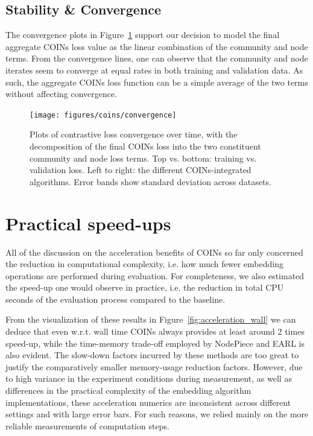 \subsection{Stability \& Convergence}

The convergence plots in Figure~\ref{fig:convergence} support our decision to model the final aggregate COINs loss value as the linear combination of the community and node terms. From the convergence lines, one can observe that the community and node iterates seem to converge at equal rates in both training and validation data. As such, the aggregate COINs loss function can be a simple average of the two terms without affecting convergence.

\begin{figure}[!ht]
\begin{center}
\texttt{[image: figures/coins/convergence]}
\end{center}
\caption[Plots of contrastive loss convergence over time.]{Plots of contrastive loss convergence over time, with the decomposition of the final COINs loss into the two constituent community and node loss terms. Top vs. bottom: training vs. validation loss. Left to right: the different COINs-integrated algorithms. Error bands show standard deviation across datasets.}
\label{fig:convergence}
\end{figure}


\section{Practical speed-ups}
All of the discussion on the acceleration benefits of COINs so far only concerned the reduction in computational complexity, i.e. how much fewer embedding operations are performed during evaluation. For completeness, we also estimated the speed-up one would observe in practice, i.e. the reduction in total CPU seconds of the evaluation process compared to the baseline. 

From the visualization of these results in Figure~\ref{fig:acceleration_wall} we can deduce that even w.r.t. wall time COINs always provides at least around 2 times speed-up, while the time-memory trade-off employed by NodePiece and EARL is also evident. The slow-down factors incurred by these methods are too great to justify the comparatively smaller memory-usage reduction factors. However, due to high variance in the experiment conditions during measurement, as well as differences in the practical complexity of the embedding algorithm implementations, these acceleration numerics are inconsistent across different settings and with large error bars. For such reasons, we relied mainly on the more reliable measurements of computation steps.

